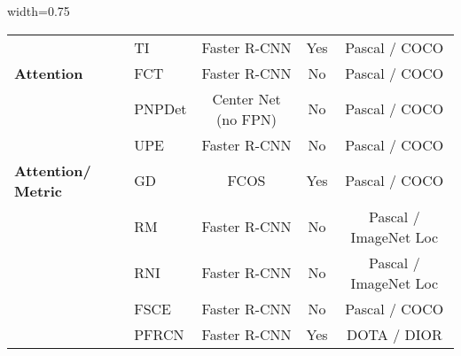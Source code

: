 \begin{table}[h]
\begin{adjustbox}{width=0.75\textwidth}
\begin{tabular}{@{}llccc}
            \cellcolor{white}                                                                    & TI \parencite{li2021transformation}               & Faster R-CNN               & Yes                         & Pascal / COCO                      \\
            \multirow{-19}{*}[0mm]{\cellcolor{white}\textbf{Attention}}                          & FCT \parencite{han2022few}                        & Faster R-CNN               & No                          & Pascal / COCO                      \\ \hline
            \cellcolor{white}                                                                    & PNPDet\parencite{zhang2021pnpdet}                 & Center Net (no FPN)        & No                          & Pascal / COCO                      \\
            \cellcolor{white}                                                                    & UPE   \parencite{wu2021universal}                 & Faster R-CNN               & No                          & Pascal / COCO                      \\
            \multirow{-3}{*}[0mm]{\cellcolor{white}\parbox{1.5cm}{\textbf{Attention/ Metric}}}   & GD \parencite{liu2021gendet}                      & FCOS                       & Yes                         & Pascal / COCO                      \\ \hline
            \cellcolor{white}                                                                    & RM    \parencite{karlinsky2019repmet}             & Faster R-CNN               & No                          & Pascal / ImageNet Loc              \\
            \cellcolor{white}                                                                    & RNI \parencite{yang2020restoring}                 & Faster R-CNN               & No                          & Pascal / ImageNet Loc              \\
            \cellcolor{white}                                                                    & FSCE  \parencite{sun2021fsce}                     & Faster R-CNN               & No                          & Pascal / COCO                      \\
            \cellcolor{white}                                                                    & PFRCN \parencite{jeune2021experience}             & Faster R-CNN               & Yes                         & DOTA / DIOR                        \\

\end{tabular}
\end{adjustbox}
\end{table}
